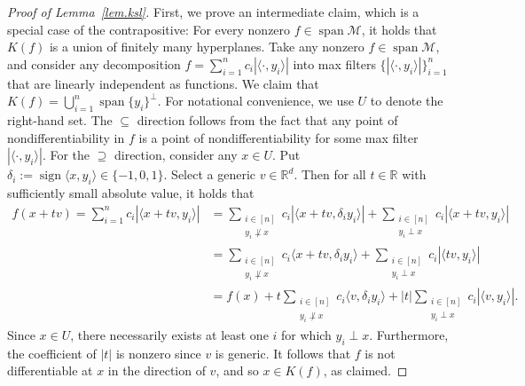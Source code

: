 \documentclass{article}
\theoremstyle{plain}
\theoremstyle{definition}
\begin{document}
\begin{proof}[Proof of Lemma~\ref{lem.ksl}]
First, we prove an intermediate claim, which is a special case of the contrapositive:
For every nonzero $f\in\operatorname{span}\mathcal{M}$, it holds that $K(f)$ is a union of finitely many hyperplanes.
Take any nonzero $f\in\operatorname{span}\mathcal{M}$, and consider any decomposition $f=\sum_{i=1}^n c_i|\langle\cdot,y_i\rangle|$ into max filters $\{|\langle\cdot,y_i\rangle|\}_{i=1}^n$ that are linearly independent as functions.
We claim that $K(f)=\bigcup_{i=1}^n\operatorname{span}\{y_i\}^\perp$.
For notational convenience, we use $U$ to denote the right-hand set.
The $\subseteq$ direction follows from the fact that any point of nondifferentiability in $f$ is a point of nondifferentiability for some max filter $|\langle\cdot,y_i\rangle|$.
For the $\supseteq$ direction, consider any $x\in U$.
Put $\delta_i:=\operatorname{sign}\langle x,y_i\rangle\in\{-1,0,1\}$.
Select a generic $v\in\mathbb{R}^d$.
Then for all $t\in\mathbb{R}$ with sufficiently small absolute value, it holds that
\begin{align*}
f(x+tv) 
= \sum_{i=1}^n c_i|\langle x+tv,y_i\rangle|
&= \sum_{\substack{i\in[n]\\[1 pt]y_i\not\perp x}} c_i|\langle x+tv,\delta_iy_i\rangle|+\sum_{\substack{i\in [n]\\[1 pt]y_i\perp x}} c_i|\langle x+tv,y_i\rangle|\\
&= \sum_{\substack{i\in[n]\\[1 pt]y_i\not\perp x}} c_i\langle x+tv,\delta_iy_i\rangle+\sum_{\substack{i\in[n]\\[1 pt]y_i\perp x}} c_i|\langle tv,y_i\rangle|\\
&=f(x)+t\sum_{\substack{i\in[n]\\[1 pt]y_i\not\perp x}} c_i\langle v,\delta_iy_i\rangle+|t|\sum_{\substack{i\in[n]\\[1 pt]y_i\perp x}} c_i|\langle v,y_i\rangle|.
\end{align*}
Since $x\in U$, there necessarily exists at least one $i$ for which $y_i\perp x$.
Furthermore, the coefficient of $|t|$ is nonzero since $v$ is generic.
It follows that $f$ is not differentiable at $x$ in the direction of $v$, and so $x\in K(f)$, as claimed.


\end{proof}
\end{document}
